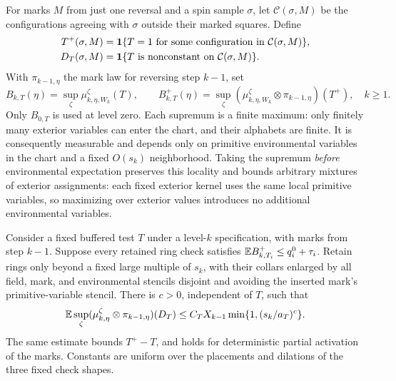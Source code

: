 For marks $M$ from just one reversal and a spin sample $\sigma$, let
$\mathcal C(\sigma,M)$ be the configurations agreeing with $\sigma$
outside their marked squares.  Define
\[
 \begin{aligned}
 T^+(\sigma,M)&=\mathbf 1\{T=1\text{ for some configuration in }
                         \mathcal C(\sigma,M)\},\\
 D_T(\sigma,M)&=\mathbf 1\{T\text{ is nonconstant on }\mathcal C(\sigma,M)\}.
 \end{aligned}
\]
With $\pi_{k-1,\eta}$ the mark law for reversing step $k-1$, set
\begin{equation}
 B_{k,T}(\eta)=\sup_\zeta\mu_{k,\eta,W_k}^{\zeta}(T),\qquad
 B^+_{k,T}(\eta)=\sup_\zeta
       (\mu_{k,\eta,W_k}^{\zeta}\otimes\pi_{k-1,\eta})(T^+),\quad k\geq1.
 \label{eq:crossing-envelopes}
\end{equation}
Only $B_{0,T}$ is used at level zero.  Each supremum is a finite maximum:
only finitely many exterior variables can enter the chart, and their
alphabets are finite.  It is consequently measurable and depends only
on primitive environmental variables in the chart and a fixed
$O(s_k)$ neighborhood.  Taking the supremum \emph{before} environmental
expectation preserves this locality and bounds arbitrary mixtures of
exterior assignments: each fixed exterior kernel uses the same local
primitive variables, so maximizing over exterior values introduces no
additional environmental variables.

\begin{lemma}
\label{lem:crossing-one-step}
Consider a fixed buffered test $T$ under a level-$k$ specification, with
marks from step $k-1$.  Suppose every retained ring check satisfies
$\mathbb E B^+_{k,T_i}\leq q_i^0+\tau_i$.  Retain rings only beyond a fixed
large multiple of $s_k$, with their collars enlarged by all field,
mark, and environmental stencils disjoint and avoiding the inserted
mark's primitive-variable stencil.  There is $c>0$, independent
of $T$, such that
\begin{equation}
 \mathbb E\sup_\zeta(\mu_{k,\eta}^{\zeta}\otimes\pi_{k-1,\eta})(D_T)
 \leq C_TX_{k-1}\min\{1,(s_k/a_T)^c\}.
 \label{eq:crossing-one-step}
\end{equation}
The same estimate bounds $T^+-T$, and holds for deterministic partial
activation of the marks.  Constants are uniform over the placements
and dilations of the three fixed check shapes.
\end{lemma}

